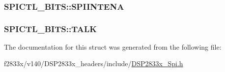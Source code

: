\subsubsection[{S\+P\+I\+I\+N\+T\+E\+N\+A}]{ S\+P\+I\+C\+T\+L\+\_\+\+B\+I\+T\+S\+::\+S\+P\+I\+I\+N\+T\+E\+N\+A}\label{struct_s_p_i_c_t_l___b_i_t_s_a4e4cbbc8a7d48509de304a2911e93507}
\hypertarget{struct_s_p_i_c_t_l___b_i_t_s_a142876bc7ff47d03eb87265b19e7b0df}{}
\subsubsection[{T\+A\+L\+K}]{ S\+P\+I\+C\+T\+L\+\_\+\+B\+I\+T\+S\+::\+T\+A\+L\+K}\label{struct_s_p_i_c_t_l___b_i_t_s_a142876bc7ff47d03eb87265b19e7b0df}


The documentation for this struct was generated from the following file\+:\begin{DoxyCompactItemize}
\item 
f2833x/v140/\+D\+S\+P2833x\+\_\+headers/include/\hyperlink{_d_s_p2833x___spi_8h}{D\+S\+P2833x\+\_\+\+Spi.\+h}\end{DoxyCompactItemize}
